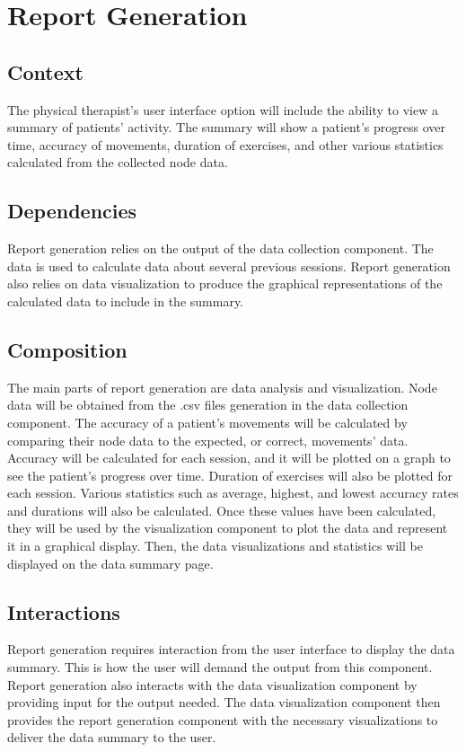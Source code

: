 \documentclass[onecolumn, draftclsnofoot,10pt, compsoc]{IEEEtran}
\begin{document}
\section{Report Generation}
\subsection{Context}
The physical therapist's user interface option will include the ability to view a summary of patients' activity. The summary will show a patient's progress over time, accuracy of movements, duration of exercises, and other various statistics calculated from the collected node data.

\subsection{Dependencies}
Report generation relies on the output of the data collection component. The data is used to calculate data about several previous sessions. Report generation also relies on data visualization to produce the graphical representations of the calculated data to include in the summary.

\subsection{Composition}
The main parts of report generation are data analysis and visualization. Node data will be obtained from the .csv files generation in the data collection component. The accuracy of a patient's movements will be calculated by comparing their node data to the expected, or correct, movements' data. Accuracy will be calculated for each session, and it will be plotted on a graph to see the patient's progress over time. Duration of exercises will also be plotted for each session. Various statistics such as average, highest, and lowest accuracy rates and durations will also be calculated. Once these values have been calculated, they will be used by the visualization component to plot the data and represent it in a graphical display. Then, the data visualizations and statistics will be displayed on the data summary page.

\subsection{Interactions}
Report generation requires interaction from the user interface to display the data summary. This is how the user will demand the output from this component. Report generation also interacts with the data visualization component by providing input for the output needed. The data visualization component then provides the report generation component with the necessary visualizations to deliver the data summary to the user.
\end{document}
